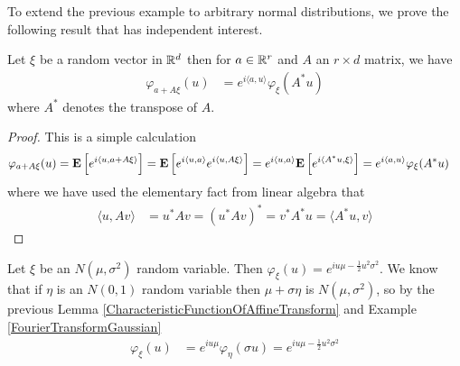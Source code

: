 To extend the previous example to arbitrary normal distributions, we
prove the following result that has independent interest.
\begin{lem}\label{CharacteristicFunctionOfAffineTransform}Let $\xi$ be a random vector in $\mathbb{R}^d$ then for $a \in
  \mathbb{R}^r$ and $A$ an $r \times d$ matrix, we have
\begin{align*}
\varphi_{a + A\xi}(u) &= e^{i\langle a, u \rangle} \varphi_\xi(A^* u)
\end{align*}
where $A^*$ denotes the transpose of $A$.
\end{lem}
\begin{proof}
This is a simple calculation
\begin{align*}
\varphi_{a + A\xi}(u) &= \textbf{E}\left[e^{i \langle u, a + A \xi
    \rangle}\right] = \textbf{E}\left[e^{i \langle u, a \rangle} e^{i \langle u,  A \xi
    \rangle}\right]
= e^{i \langle u, a \rangle}\textbf{E}\left[e^{i \langle A^* u,  \xi
    \rangle}\right] = e^{i\langle a, u \rangle} \varphi_\xi(A^* u)
\end{align*}
where we have used the elementary fact from linear algebra that
\begin{align*}
\langle u,  Av \rangle &= u^*Av = (u^*Av)^* = v^* A^*u = \langle A^*u,  v \rangle
\end{align*}
\end{proof}

\begin{examp}\label{FourierTransformGeneralGaussian}Let $\xi$ be an $N(\mu,\sigma^2)$ random variable.  Then
  $\varphi_\xi(u) = e^{iu\mu - \frac{1}{2} u^2\sigma^2}$.  We know
  that if $\eta$ is an $N(0,1)$ random variable then $\mu +
  \sigma\eta$ is $N(\mu, \sigma^2)$, so by the previous Lemma
  \ref{CharacteristicFunctionOfAffineTransform} and Example \ref{FourierTransformGaussian}
\begin{align*}
\varphi_\xi(u) &= e^{iu\mu} \varphi_\eta(\sigma u) = e^{iu\mu - \frac{1}{2} u^2\sigma^2}
\end{align*}
\end{examp}


